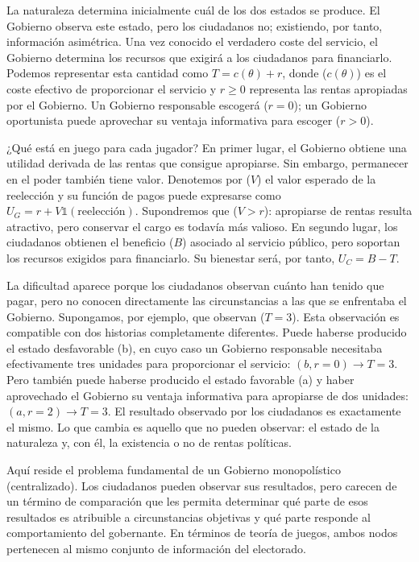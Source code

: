 \documentclass[10pt,a4paper]{article}
\begin{document}
La naturaleza determina inicialmente cuál de los dos estados se produce. El Gobierno observa este estado, pero los ciudadanos no; existiendo, por tanto, información asimétrica. Una vez conocido el verdadero coste del servicio, el Gobierno determina los recursos que exigirá a los ciudadanos para financiarlo. Podemos representar esta cantidad como $T=c(\theta)+r$, donde ($c(\theta)$) es el coste efectivo de proporcionar el servicio y $r\geq0$ representa las rentas apropiadas por el Gobierno. Un Gobierno responsable escogerá ($r=0$); un Gobierno oportunista puede aprovechar su ventaja informativa para escoger ($r>0$).

¿Qué está en juego para cada jugador? En primer lugar, el Gobierno obtiene una utilidad derivada de las rentas que consigue apropiarse. Sin embargo, permanecer en el poder también tiene valor. Denotemos por ($V$) el valor esperado de la reelección y su función de pagos puede expresarse como $U_G=r+V\mathbb{1}(\text{reelección})$. Supondremos que ($V>r$): apropiarse de rentas resulta atractivo, pero conservar el cargo es todavía más valioso. En segundo lugar, los ciudadanos obtienen el beneficio ($B$) asociado al servicio público, pero soportan los recursos exigidos para financiarlo. Su bienestar será, por tanto, $U_C=B-T$.

La dificultad aparece porque los ciudadanos observan cuánto han tenido que pagar, pero no conocen directamente las circunstancias a las que se enfrentaba el Gobierno. Supongamos, por ejemplo, que observan ($T=3$). Esta observación es compatible con dos historias completamente diferentes. Puede haberse producido el estado desfavorable (b), en cuyo caso un Gobierno responsable necesitaba efectivamente tres unidades para proporcionar el servicio: $(b,r=0)\longrightarrow T=3$. Pero también puede haberse producido el estado favorable (a) y haber aprovechado el Gobierno su ventaja informativa para apropiarse de dos unidades: $(a,r=2)\longrightarrow T=3$. El resultado observado por los ciudadanos es exactamente el mismo. Lo que cambia es aquello que no pueden observar: el estado de la naturaleza y, con él, la existencia o no de rentas políticas.

Aquí reside el problema fundamental de un Gobierno monopolístico (centralizado). Los ciudadanos pueden observar sus resultados, pero carecen de un término de comparación que les permita determinar qué parte de esos resultados es atribuible a circunstancias objetivas y qué parte responde al comportamiento del gobernante. En términos de teoría de juegos, ambos nodos pertenecen al mismo conjunto de información del electorado. 
\end{document}
